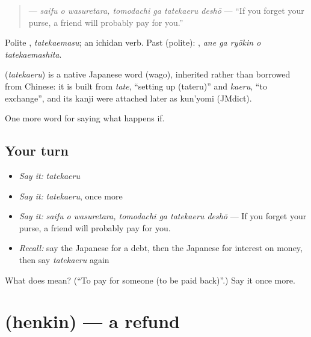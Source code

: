 \begin{quote}
\textbf{  } — \emph{saifu o wasuretara, tomodachi ga tatekaeru deshō} — \textquotedblleft{}If you forget your purse, a friend will probably pay for you.\textquotedblright{}
\end{quote}

Polite \textbf{}, \emph{tatekaemasu}; an ichidan verb. Past (polite): \textbf{  }, \emph{ane ga ryōkin o tatekaemashita}.

\begin{cousinweb}
\textbf{} (\emph{tatekaeru}) is a native Japanese word (wago), inherited rather than borrowed from Chinese: it is built from \emph{tate}, \textquotedblleft{}setting up (tateru)\textquotedblright{} and \emph{kaeru}, \textquotedblleft{}to exchange\textquotedblright{}, and its kanji were attached later as kun'yomi (JMdict).
\end{cousinweb}

\begin{grammarlens}[title={What you've built}]
One more word for saying what happens if.
\end{grammarlens}

\subsection*{Your turn}
\begin{itemize}
\raggedright
  \item \emph{Say it:} \emph{tatekaeru}
  \item \emph{Say it:} \emph{tatekaeru}, once more
  \item \emph{Say it:} \emph{saifu o wasuretara, tomodachi ga tatekaeru deshō} — If you forget your purse, a friend will probably pay for you.
  \item \emph{Recall:} say the Japanese for a debt, then the Japanese for interest on money, then say \emph{tatekaeru} again
\end{itemize}

\begin{tcolorbox}[breakable,colback=teal!4,colframe=teal!35!black,title={Before you move on}]
What does  mean? (\textquotedblleft{}To pay for someone (to be paid back)\textquotedblright{}.) Say it once more.
\end{tcolorbox}
\section[\texorpdfstring{\ja{へんきん} (henkin)}{へんきん (henkin)}]{ (henkin) — a refund}

